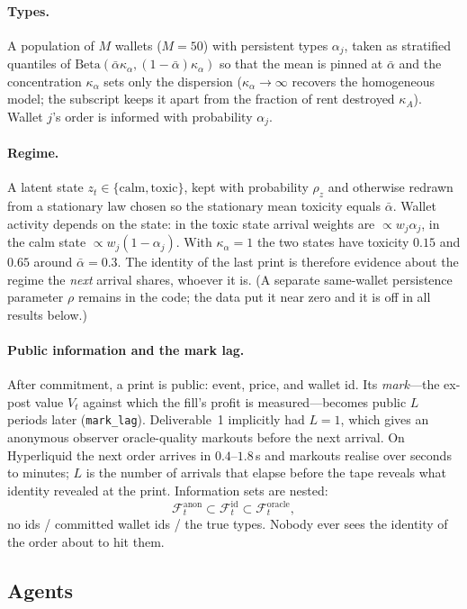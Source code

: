 \documentclass[11pt]{article}
\newcommand{\Fanon}{\mathcal{F}^{\mathrm{anon}}}
\newcommand{\Fid}{\mathcal{F}^{\mathrm{id}}}
\newcommand{\For}{\mathcal{F}^{\mathrm{oracle}}}
\begin{document}
\paragraph{Types.} A population of $M$ wallets ($M=50$) with persistent types $\alpha_j$, taken as stratified quantiles of $\mathrm{Beta}(\bar\alpha\kappa_\alpha,(1-\bar\alpha)\kappa_\alpha)$ so that the mean is pinned at $\bar\alpha$ and the concentration $\kappa_\alpha$ sets only the dispersion ($\kappa_\alpha\to\infty$ recovers the homogeneous model; the subscript keeps it apart from the fraction of rent destroyed $\kappa_A$). Wallet $j$'s order is informed with probability $\alpha_j$.

\paragraph{Regime.} A latent state $z_t\in\{\text{calm},\text{toxic}\}$, kept with probability $\rho_z$ and otherwise redrawn from a stationary law chosen so the stationary mean toxicity equals $\bar\alpha$. Wallet activity depends on the state: in the toxic state arrival weights are $\propto w_j\alpha_j$, in the calm state $\propto w_j(1-\alpha_j)$. With $\kappa_\alpha=1$ the two states have toxicity $0.15$ and $0.65$ around $\bar\alpha=0.3$. The identity of the last print is therefore evidence about the regime the \emph{next} arrival shares, whoever it is. (A separate same-wallet persistence parameter $\rho$ remains in the code; the data put it near zero and it is off in all results below.)

\paragraph{Public information and the mark lag.} After commitment, a print is public: event, price, and wallet id. Its \emph{mark}---the ex-post value $V_t$ against which the fill's profit is measured---becomes public $L$ periods later (\texttt{mark\_lag}). Deliverable~1 implicitly had $L=1$, which gives an anonymous observer oracle-quality markouts before the next arrival. On Hyperliquid the next order arrives in $0.4$--$1.8$\,s and markouts realise over seconds to minutes; $L$ is the number of arrivals that elapse before the tape reveals what identity revealed at the print. Information sets are nested:
\[
\Fanon_t \subset \Fid_t \subset \For_t ,
\]
no ids / committed wallet ids / the true types. Nobody ever sees the identity of the order about to hit them.

\subsection{Agents}
\end{document}
